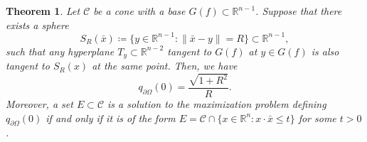 \documentclass[artcle, 11pt, reqno]{amsart}
\numberwithin{equation}{section}
\newcommand{\R}{\mathbb{R}}
\newcommand{\N}{\mathbb{N}}
\newcommand{\Hd}{\mathcal{H}}
\newcommand{\pom}{{\partial \Omega}}
\newcommand{\ind}{\mathbbm{1}}
\newcommand{\C}{\mathcal{C}}
\newcommand{\dd}{\: d}
\DeclareMathOperator{\Tr}{Tr}
\theoremstyle{plain}
\newtheorem{theorem}{Theorem}
\theoremstyle{definition}
\theoremstyle{remark}
\begin{document}
	\begin{theorem}
		Let $\C$ be a cone with a base $G(f) \subset \R^{n-1}$. Suppose that there exists a sphere 
		\[
		S_R(\bar{x}) \coloneqq \{ y \in \R^{n-1} : \|\bar{x}-y\| = R \} \subset \R^{n-1},
		\]
		such that any hyperplane $T_y \subset \R^{n-2}$ tangent to $G(f)$ at $y \in G(f)$ is also tangent to $S_R(x)$ at the same point. Then, we have 
		\[
		q_\pom(0)=\frac{\sqrt{1+R^2}}{R}.
		\]
		Moreover, a set $E\subset\C$ is a solution to the maximization problem defining $q_\pom(0)$ if and only if it is of the form $E=\C\cap \{x\in\R^n : x\cdot \bar{x} \leq t\}$ for some $t>0$.
	\end{theorem}
	
	
	
	
	
	
\end{document}
